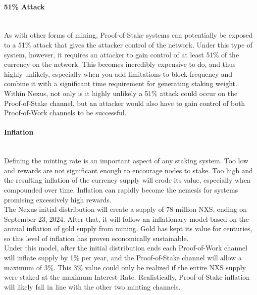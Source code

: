 \documentclass[11pt]{article}
\begin{document}
\paragraph{51\% Attack} ~\\
As with other forms of mining, Proof-of-Stake systems can potentially be exposed to a 51\% attack that gives the attacker control of the network. Under this type of system, however, it requires an attacker to gain control of at least 51\% of the currency on the network. This becomes incredibly expensive to do, and thus highly unlikely, especially when you add limitations to block frequency and combine it with a significant time requirement for generating staking weight.\\

\noindent Within Nexus, not only is it highly unlikely a 51\% attack could occur on the Proof-of-Stake channel, but an attacker would also have to gain control of both Proof-of-Work channels to be successful. \\

\paragraph{Inflation} ~\\
Defining the minting rate is an important aspect of any staking system. Too low and rewards are not significant enough to encourage nodes to stake. Too high and the resulting inflation of the currency supply will erode its value, especially when compounded over time. Inflation can rapidly become the nemesis for systems promising excessively high rewards. \\

\noindent The Nexus initial distribution will create a supply of 78 million NXS, ending on September 23, 2024. After that, it will follow an inflationary model based on the annual inflation of gold supply from mining. Gold has kept its value for centuries, so this level of inflation has proven economically sustainable. \\

\noindent Under this model, after the initial distribution ends each Proof-of-Work channel will inflate supply by 1\% per year, and the Proof-of-Stake channel will allow a maximum of 3\%. This 3\% value could only be realized if the entire NXS supply were staked at the maximum Interest Rate. Realistically, Proof-of-Stake inflation will likely fall in line with the other two minting channels.\\
\end{document}
